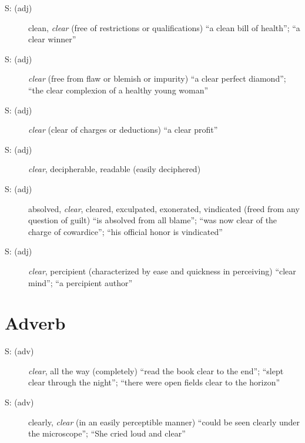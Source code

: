 \begin{description}
  \item [S: (adj)] clean, \emph{clear} (free of restrictions or qualifications) ``a clean bill of health''; ``a clear winner''
  \item [S: (adj)] \emph{clear} (free from flaw or blemish or impurity) ``a clear perfect diamond''; ``the clear complexion of a healthy young woman''
  \item [S: (adj)] \emph{clear} (clear of charges or deductions) ``a clear profit''
  \item [S: (adj)] \emph{clear}, decipherable, readable (easily deciphered) 
  \item [S: (adj)] absolved, \emph{clear}, cleared, exculpated, exonerated, vindicated (freed from any question of guilt) ``is absolved from all blame''; ``was now clear of the charge of cowardice''; ``his official honor is vindicated''
  \item [S: (adj)] \emph{clear}, percipient (characterized by ease and quickness in perceiving) ``clear mind''; ``a percipient author''
\end{description}


\section{Adverb}
\begin{description}
  \item [S: (adv)] \emph{clear}, all the way (completely) ``read the book clear to the end''; ``slept clear through the night''; ``there were open fields clear to the horizon''
  \item [S: (adv)] clearly, \emph{clear} (in an easily perceptible manner) ``could be seen clearly under the microscope''; ``She cried loud and clear''
\end{description}